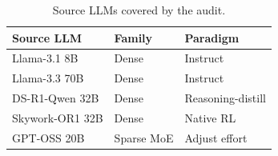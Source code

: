 \begin{table}
  \vspace{-0.6em}
  \caption{Source LLMs covered by the audit.}
  \label{tab:source-llms}
  \centering
  \footnotesize
  \setlength{\tabcolsep}{4pt}
  \renewcommand{\arraystretch}{1.1}
  \begin{tabular}{@{}l l l@{}}
    \toprule
    \textbf{Source LLM} & \textbf{Family} & \textbf{Paradigm} \\
    \midrule
    Llama-3.1 8B    & Dense      & Instruct          \\
    Llama-3.3 70B   & Dense      & Instruct          \\
    DS-R1-Qwen 32B  & Dense      & Reasoning-distill \\
    Skywork-OR1 32B & Dense      & Native RL         \\
    GPT-OSS 20B     & Sparse MoE & Adjust effort  \\
    \bottomrule
  \end{tabular}
  \vspace{-0.6em}
\end{table}
